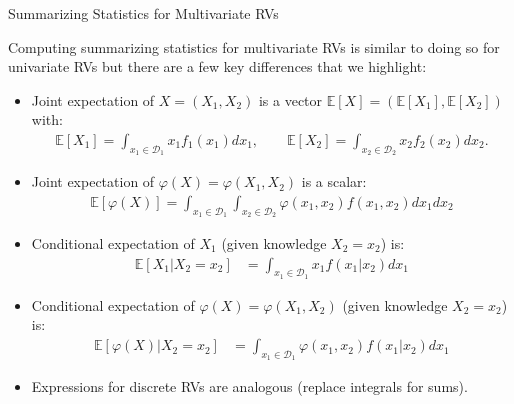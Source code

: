 \documentclass[handout,9pt]{beamer}
\begin{document}
%
\begin{frame}{Summarizing Statistics for Multivariate RVs}

Computing summarizing statistics for multivariate RVs is similar to doing so for univariate RVs but there are a few key differences that we highlight:
\begin{itemize}
\setlength{\itemsep}{10pt}
\item Joint expectation of $X=(X_1,X_2)$ is a vector $\mathbb{E}[X]=(\mathbb{E}[X_1],\mathbb{E}[X_2])$ with:
\begin{align*}
\mathbb{E}[X_1]=\int_{x_1\in \mathcal{D}_1}x_1f_1(x_1)dx_1,\qquad \mathbb{E}[X_2]=\int_{x_2\in \mathcal{D}_2}x_2f_2(x_2)dx_2.
\end{align*}
\item Joint expectation of $\varphi(X)=\varphi(X_1,X_2)$ is a scalar:
 \begin{align*}
\mathbb{E}[\varphi(X)]=\int_{x_1\in \mathcal{D}_1}\int_{x_2\in\mathcal{D}_2}\varphi(x_1,x_2)f(x_1,x_2)dx_1dx_2
\end{align*}
\item Conditional expectation of $X_1$ (given knowledge $X_2=x_2$) is:
 \begin{align*}
\mathbb{E}[X_1|X_2=x_2]&=\int_{x_1\in \mathcal{D}_1}x_1f(x_1|x_2)dx_1
\end{align*}
\item Conditional expectation of $\varphi(X)=\varphi(X_1,X_2)$ (given knowledge $X_2=x_2$) is:
 \begin{align*}
\mathbb{E}[\varphi(X)|X_2=x_2]&=\int_{x_1\in \mathcal{D}_1}\varphi(x_1,x_2)f(x_1|x_2)dx_1
\end{align*}
\item Expressions for discrete RVs are analogous (replace integrals for sums). 

\end{itemize}

\end{frame}
\end{document}
